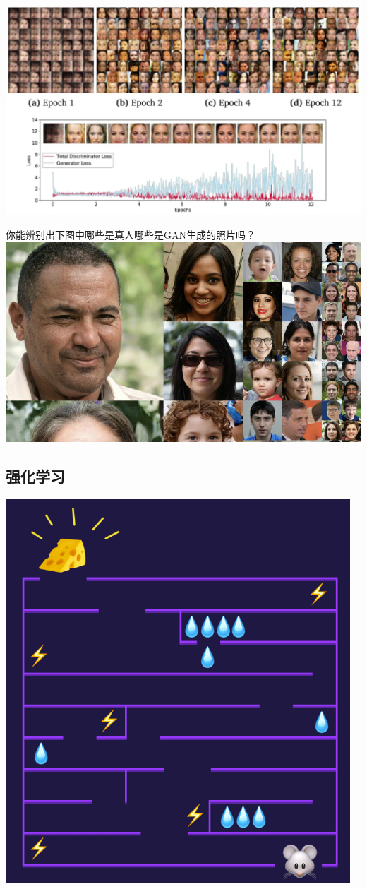 \documentclass[11pt]{article}
\makeatletter
\def\maxwidth{\ifdim\Gin@nat@width>\linewidth\linewidth
    \else\Gin@nat@width\fi}
\let\Oldincludegraphics\includegraphics
\renewcommand{\includegraphics}[1]{\Oldincludegraphics[width=.8\maxwidth]{#1}}
\makeatother
\begin{document}
    \includegraphics{img/celeA.png}

    你能辨别出下图中哪些是真人哪些是GAN生成的照片吗？
\includegraphics{img/ganface.jpg}

    \hypertarget{ux5f3aux5316ux5b66ux4e60}{%
\subsection{强化学习}\label{ux5f3aux5316ux5b66ux4e60}}

\includegraphics{img/rl.png}
\end{document}
